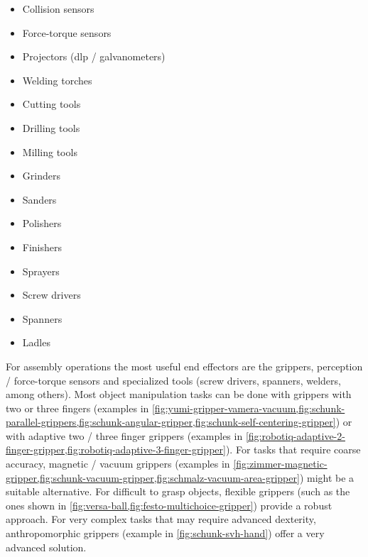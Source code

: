 \begin{itemize}
\begin{itemize}
		\item Point / line lasers
		\item \glspl{lidar}
		\item RGB-D sensors
		\item Structured light sensors
	\end{itemize}
	\item Collision sensors
	\item Force-torque sensors
	\item Projectors (\gls{dlp} / galvanometers)
	\item Welding torches
	\item Cutting tools
	\item Drilling tools
	\item Milling tools
	\item Grinders
	\item Sanders
	\item Polishers
	\item Finishers
	\item Sprayers
	\item Screw drivers
	\item Spanners
	\item Ladles
\end{itemize}


For assembly operations the most useful end effectors are the grippers, perception / force-torque sensors and specialized tools (screw drivers, spanners, welders, among others). Most object manipulation tasks can be done with grippers with two or three fingers (examples in \cref{fig:yumi-gripper-vamera-vacuum,fig:schunk-parallel-grippers,fig:schunk-angular-gripper,fig:schunk-self-centering-gripper}) or with adaptive two / three finger grippers (examples in \cref{fig:robotiq-adaptive-2-finger-gripper,fig:robotiq-adaptive-3-finger-gripper}). For tasks that require coarse accuracy, magnetic / vacuum grippers (examples in \cref{fig:zimmer-magnetic-gripper,fig:schunk-vacuum-gripper,fig:schmalz-vacuum-area-gripper}) might be a suitable alternative. For difficult to grasp objects, flexible grippers (such as the ones shown in \cref{fig:versa-ball,fig:festo-multichoice-gripper}) provide a robust approach. For very complex tasks that may require advanced dexterity, anthropomorphic grippers (example in \cref{fig:schunk-svh-hand}) offer a very advanced solution.

